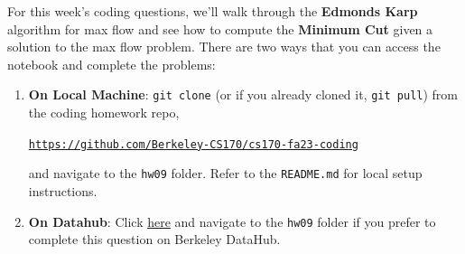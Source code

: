 \documentclass[11pt]{article}
\begin{document}
For this week’s coding questions, we'll walk through the \textbf{Edmonds Karp} algorithm for max flow and see how to compute the \textbf{Minimum Cut} given a solution to the max flow problem.  There are two ways that you can access the notebook and complete the problems:
\begin{enumerate}
    \item \textbf{On Local Machine}: \texttt{git clone} (or if you already cloned it, \texttt{git pull}) from the coding homework repo, 
    
    \textcolor{blue}{\href{https://github.com/Berkeley-CS170/cs170-fa23-coding}{\texttt{https://github.com/Berkeley-CS170/cs170-fa23-coding}}}
    
    and navigate to the \texttt{hw09} folder. Refer to the \texttt{README.md} for local setup instructions.

    \item \textbf{On Datahub}: Click \textcolor{blue}{\href{https://datahub.berkeley.edu/hub/user-redirect/git-pull?repo=https://github.com/Berkeley-CS170/cs170-fa23-coding}{here}} and navigate to the \texttt{hw09} folder if you prefer to complete this question on Berkeley DataHub.
\end{enumerate}
\end{document}
